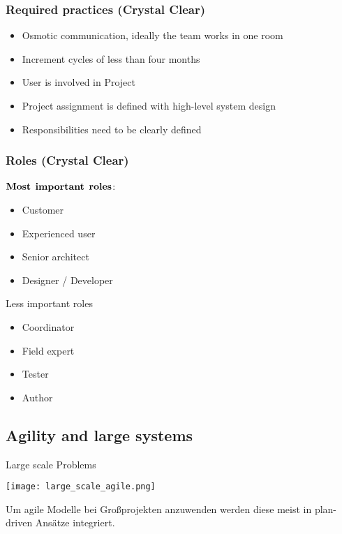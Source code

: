 \subsubsection{Required practices (Crystal Clear)}
\begin{itemize}
	\item Osmotic communication, ideally the team works in one room
	\item Increment cycles of less than four months
	\item User is involved in Project
	\item Project assignment is defined with high-level system design
	\item Responsibilities need to be clearly defined 
\end{itemize}
\subsubsection{Roles (Crystal Clear)}
\begin{multicols}{2}
$\bold{Most}$ $\bold{important}$	 $\bold{roles}$:
\begin{itemize}
	\item Customer
	\item Experienced user
	\item Senior architect
	\item Designer / Developer
\end{itemize}
\columnbreak
Less important roles
\begin{itemize}
	\item Coordinator
	\item Field expert
	\item Tester
	\item Author
\end{itemize}
\end{multicols}
\subsection{Agility and large systems}
\begin{table}[H]
\caption{Large scale Problems}
\texttt{[image: large\_scale\_agile.png]}	
\end{table}
Um agile Modelle bei Großprojekten anzuwenden werden diese meist in plan-driven Ansätze integriert.

















